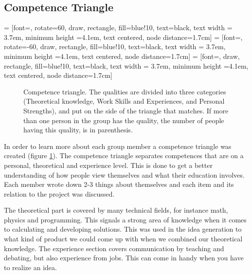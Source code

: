 
\subsection{Competence Triangle}

 = [font=\footnotesize, rotate=60,  draw, rectangle, fill=blue!10, text=black, text width = 3.7em, minimum height =4.1em, text centered, node distance=1.7cm]
 =  [font=\footnotesize, rotate=-60, draw, rectangle, fill=blue!10, text=black, text width = 3.7em, minimum height =4.1em, text centered, node distance=1.7cm]
 = [font=\footnotesize,             draw, rectangle, fill=blue!10, text=black, text width = 3.7em, minimum height =4.1em, text centered, node distance=1.7cm]

\begin{figure}[!ht]
\centering
{}
\caption{Competence triangle. The qualities are divided into three categories (Theoretical knowledge, Work Skills and Experiences, and Personal Strengths), and put on the side of the triangle that matches. If more than one person in the group has the quality, the number of people having this quality, is in parenthesis.} \label{fig_triangle}
\end{figure}

In order to learn more about each group member a competence triangle was created (figure \ref{fig_triangle}). 
The competence triangle separates competences that are on a personal, theoretical and experience level. 
This is done to get a better understanding of how people view themselves and what their education involves.
Each member wrote down 2-3 things about themselves and each item and its relation to the project was discussed.

The theoretical part is covered by many technical fields, for instance math, physics and programming. 
This signals a strong area of knowledge when it comes to calculating and developing solutions. 
This was used in the idea generation to what kind of product we could come up with when we combined our theoretical knowledge. The experience section covers communication by teaching and debating, but also experience from jobs. This can come in handy when you have to realize an idea. 


